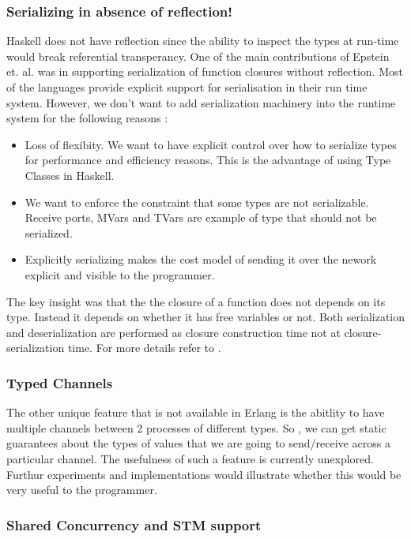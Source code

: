 \documentclass[twoside]{article}
\begin{document}
\subsubsection{Serializing in absence of reflection!}
\label{sec:seri-absence-refl}

Haskell does not have reflection since the ability to inspect the
types at run-time would break referential transperancy. One of the
main contributions of Epstein et. al. \cite{epstein2011towards} was in supporting
serialization of function closures without reflection. Most of the
languages provide explicit support for serialisation in their run time
system. However, we don't want to add serialization machinery into the
runtime system for the following reasons :
\begin{itemize}
\item Loss of flexibity. We want to have explicit control over how to
  serialize types for performance and efficiency reasons. This is the
  advantage of using Type Classes in Haskell.
\item We want to enforce the constraint that some types are not
  serializable. Receive ports, MVars and TVars are example of type that
  should not be serialized. 
\item Explicitly serializing makes the cost model of sending it over
  the nework explicit and visible to the programmer.
\end{itemize}

The key insight was that the the closure of a function does not
depends on its type. Instead it depends on whether it has free
variables or not. Both serialization and deserialization are performed
as closure construction time not at closure-serialization time. For
more details refer to \cite{epstein2011towards}. 

\subsubsection{Typed Channels}
\label{sec:typed-channels}

The other unique feature that is not available in Erlang is the
abitlity to have multiple channels between 2 processes of different
types. So , we can get static guarantees about the types of values
that we are going to send/receive across a particular channel. The
usefulness of such a feature is currently unexplored. Furthur
experiments and implementations would illustrate whether this would be
very useful to the programmer.

\subsubsection{Shared Concurrency and STM support}
\label{sec:shar-conc-stm}
\end{document}
